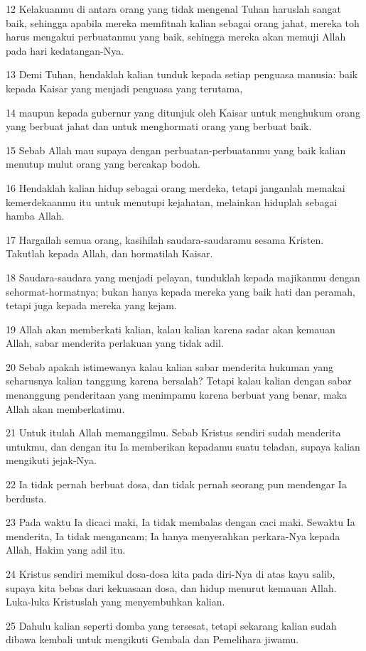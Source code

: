 \par 12 Kelakuanmu di antara orang yang tidak mengenal Tuhan haruslah sangat baik, sehingga apabila mereka memfitnah kalian sebagai orang jahat, mereka toh harus mengakui perbuatanmu yang baik, sehingga mereka akan memuji Allah pada hari kedatangan-Nya.
\par 13 Demi Tuhan, hendaklah kalian tunduk kepada setiap penguasa manusia: baik kepada Kaisar yang menjadi penguasa yang terutama,
\par 14 maupun kepada gubernur yang ditunjuk oleh Kaisar untuk menghukum orang yang berbuat jahat dan untuk menghormati orang yang berbuat baik.
\par 15 Sebab Allah mau supaya dengan perbuatan-perbuatanmu yang baik kalian menutup mulut orang yang bercakap bodoh.
\par 16 Hendaklah kalian hidup sebagai orang merdeka, tetapi janganlah memakai kemerdekaanmu itu untuk menutupi kejahatan, melainkan hiduplah sebagai hamba Allah.
\par 17 Hargailah semua orang, kasihilah saudara-saudaramu sesama Kristen. Takutlah kepada Allah, dan hormatilah Kaisar.
\par 18 Saudara-saudara yang menjadi pelayan, tunduklah kepada majikanmu dengan sehormat-hormatnya; bukan hanya kepada mereka yang baik hati dan peramah, tetapi juga kepada mereka yang kejam.
\par 19 Allah akan memberkati kalian, kalau kalian karena sadar akan kemauan Allah, sabar menderita perlakuan yang tidak adil.
\par 20 Sebab apakah istimewanya kalau kalian sabar menderita hukuman yang seharusnya kalian tanggung karena bersalah? Tetapi kalau kalian dengan sabar menanggung penderitaan yang menimpamu karena berbuat yang benar, maka Allah akan memberkatimu.
\par 21 Untuk itulah Allah memanggilmu. Sebab Kristus sendiri sudah menderita untukmu, dan dengan itu Ia memberikan kepadamu suatu teladan, supaya kalian mengikuti jejak-Nya.
\par 22 Ia tidak pernah berbuat dosa, dan tidak pernah seorang pun mendengar Ia berdusta.
\par 23 Pada waktu Ia dicaci maki, Ia tidak membalas dengan caci maki. Sewaktu Ia menderita, Ia tidak mengancam; Ia hanya menyerahkan perkara-Nya kepada Allah, Hakim yang adil itu.
\par 24 Kristus sendiri memikul dosa-dosa kita pada diri-Nya di atas kayu salib, supaya kita bebas dari kekuasaan dosa, dan hidup menurut kemauan Allah. Luka-luka Kristuslah yang menyembuhkan kalian.
\par 25 Dahulu kalian seperti domba yang tersesat, tetapi sekarang kalian sudah dibawa kembali untuk mengikuti Gembala dan Pemelihara jiwamu.


